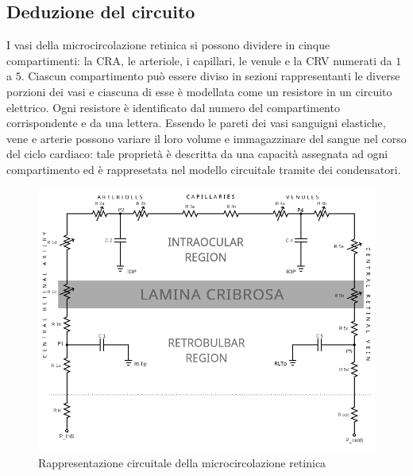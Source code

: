 \documentclass{article}
\begin{document}
\subsection{Deduzione del circuito}
I vasi della microcircolazione retinica si possono dividere in cinque compartimenti: la CRA, le arteriole, i capillari, le venule e la CRV numerati da $1$ a $5$.
Ciascun compartimento può essere diviso in sezioni rappresentanti le diverse porzioni dei vasi e ciascuna di esse è modellata come un resistore in un circuito elettrico.
Ogni resistore è identificato dal numero del compartimento corrispondente e da una lettera.
Essendo le pareti dei vasi sanguigni elastiche, vene e arterie possono variare il loro volume e immagazzinare del sangue nel corso del ciclo cardiaco: tale proprietà è descritta da una capacità assegnata ad ogni compartimento ed è rappresetata nel modello circuitale tramite dei condensatori.

\begin{figure}[h]
\begin{center}
\includegraphics[width=1.0\textwidth]{Pictures/circuit1.png}
\caption{Rappresentazione circuitale della microcircolazione retinica \cite{art1}}
\label{circuito}
\end{center}
\end{figure}
\end{document}
